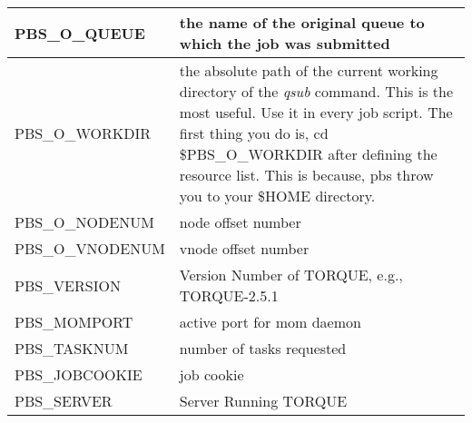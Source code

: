 \begin{longtable}{|p{}|p{}|}
PBS\_O\_QUEUE    & the name of the original queue to which the job was submitted \\ \hline
PBS\_O\_WORKDIR  & the absolute path of the current working directory of the \emph{qsub} command. This is the most useful. Use it in every job script. The first thing you do is, cd \$PBS\_O\_WORKDIR after defining the resource list. This is because, pbs throw you to your \$HOME directory. \\ \hline
PBS\_O\_NODENUM  & node offset number \\ \hline
PBS\_O\_VNODENUM & vnode offset number \\ \hline
PBS\_VERSION     & Version Number of TORQUE, e.g., TORQUE-2.5.1 \\ \hline
PBS\_MOMPORT     & active port for mom daemon \\ \hline
PBS\_TASKNUM     & number of tasks requested \\ \hline
PBS\_JOBCOOKIE   & job cookie \\ \hline
PBS\_SERVER      & Server Running TORQUE \\ \hline
\end{longtable}

